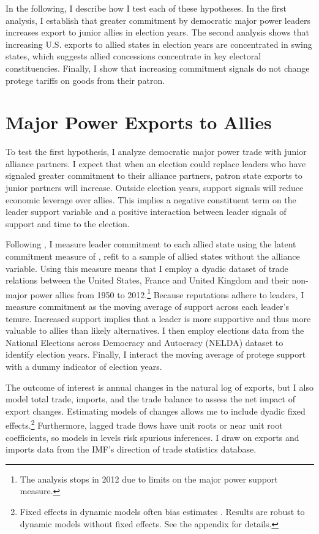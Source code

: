 \documentclass[12pt]{article}
\begin{document}
In the following, I describe how I test each of these hypotheses. 
In the first analysis, I establish that greater commitment by democratic major power leaders increases export to junior allies in election years. 
The second analysis shows that increasing U.S. exports to allied states in election years are concentrated in swing states, which suggests allied concessions concentrate in key electoral constituencies.
Finally, I show that increasing commitment signals do not change protege tariffs on goods from their patron.



\section{Major Power Exports to Allies}

To test the first hypothesis, I analyze democratic major power trade with junior alliance partners. 
I expect that when an election could replace leaders who have signaled greater commitment to their alliance partners, patron state exports to junior partners will increase.
Outside election years, support signals will reduce economic leverage over allies.
This implies a negative constituent term on the leader support variable and a positive interaction between leader signals of support and time to the election.


Following \citet{DigiuseppeShea2021}, I measure leader commitment to each allied state using the latent commitment measure of \citet{McManusNieman2019}, refit to a sample of allied states without the alliance variable. 
Using this measure means that I employ a dyadic dataset of trade relations between the United States, France and United Kingdom and their non-major power allies from 1950 to 2012.\footnote{The analysis stops in 2012 due to limits on the major power support measure.}
Because reputations adhere to leaders, I measure commitment as the moving average of support across each leader's tenure. 
Increased support implies that a leader is more supportive and thus more valuable to allies than likely alternatives.
I then employ elections data from the National Elections across Democracy and Autocracy (NELDA) dataset \citep{HydeMarinov2012} to identify election years.
Finally, I interact the moving average of protege support with a dummy indicator of election years.


The outcome of interest is annual changes in the natural log of exports, but I also model total trade, imports, and the trade balance to assess the net impact of export changes.
Estimating models of changes allows me to include dyadic fixed effects.\footnote{Fixed effects in dynamic models often bias estimates \citep{Nickell1981}. Results are robust to dynamic models without fixed effects. See the appendix for details.}
Furthermore, lagged trade flows have unit roots or near unit root coefficients, so models in levels risk spurious inferences.
I draw on exports and imports data from the IMF's direction of trade statistics database.
\end{document}

